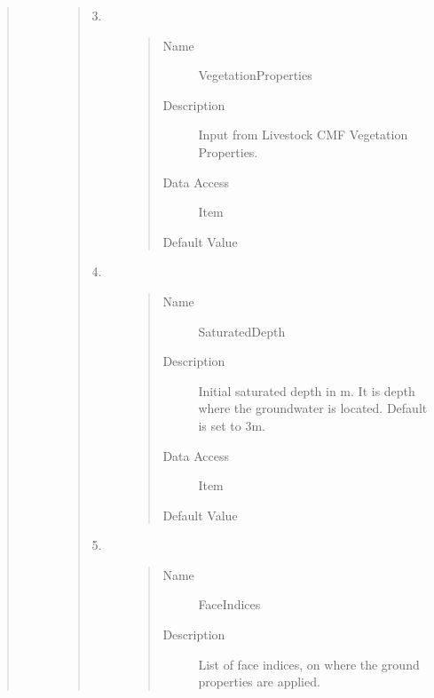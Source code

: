 \documentclass[letterpaper,10pt,english]{sphinxmanual}
\begin{document}
\begin{quote}
\begin{description}
\begin{quote}
\begin{description}
\begin{quote}
\begin{description}
\end{description}\end{quote}

\item[{3.}] \leavevmode\begin{quote}\begin{description}
\item[{Name}] \leavevmode
VegetationProperties

\item[{Description}] \leavevmode
Input from Livestock CMF Vegetation Properties.

\item[{Data Access}] \leavevmode
Item

\item[{Default Value}] \leavevmode
{}

\end{description}\end{quote}

\item[{4.}] \leavevmode\begin{quote}\begin{description}
\item[{Name}] \leavevmode
SaturatedDepth

\item[{Description}] \leavevmode
Initial saturated depth in m. It is depth where the groundwater is located. Default is set
to 3m.

\item[{Data Access}] \leavevmode
Item

\item[{Default Value}] \leavevmode
{}

\end{description}\end{quote}

\item[{5.}] \leavevmode\begin{quote}\begin{description}
\item[{Name}] \leavevmode
FaceIndices

\item[{Description}] \leavevmode
List of face indices, on where the ground properties are applied.


\end{description}
\end{quote}
\end{description}
\end{quote}
\end{description}
\end{quote}
\end{document}
